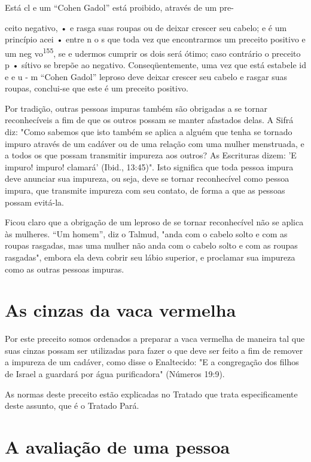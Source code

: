 Está cl e um ``Cohen Gadol'' está proibido, através de um pre-

ceito negativo, • e rasga suas roupas ou de deixar crescer seu cabelo; e
é um princípio acei • entre n o s que toda vez que encontrarmos um
preceito positi­vo e um neg vo\textsuperscript{155}, se e udermos
cumprir os dois será ótimo; caso contrário o preceito p • sítivo se
brepõe ao negativo. Conseqüentemente, uma vez que está estabele id e e u
- m ``Cohen Gadol'' leproso deve deixar crescer seu ca­belo e rasgar suas
roupas, conclui-se que este é um preceito positivo.

Por tradição, outras pessoas impuras também são obrigadas a se tor­nar
reconhecíveis a fim de que os outros possam se manter afastados delas. A
Sifrá diz: "Como sabemos que isto também se aplica a alguém que tenha se
tor­nado impuro através de um cadáver ou de uma relação com uma mulher
mens­truada, e a todos os que possam transmitir impureza aos outros? As
Escrituras dizem: 'E impuro! impuro! clamará' (Ibid., 13:45)". Isto
significa que toda pes­soa impura deve anunciar sua impureza, ou seja,
deve se tornar reconhecível como pessoa impura, que transmite impureza
com seu contato, de forma a que as pessoas possam evitá-la.

Ficou claro que a obrigação de um leproso de se tornar reconhecí­vel não
se aplica às mulheres. ``Um homem'', diz o Talmud, "anda com o cabe­lo
solto e com as roupas rasgadas, mas uma mulher não anda com o cabelo
sol­to e com as roupas rasgadas", embora ela deva cobrir seu lábio
superior, e pro­clamar sua impureza como as outras pessoas impuras.

\section{As cinzas da vaca vermelha}

Por este preceito somos ordenados a preparar a vaca vermelha de maneira
tal que suas cinzas possam ser utilizadas para fazer o que deve ser
feito a fim de remover a impureza de um cadáver, como disse o
Enaltecido: "E a congregação dos filhos de Israel a guardará por água
purificadora" (Números 19:9).

As normas deste preceito estão explicadas no Tratado que trata
es­pecificamente deste assunto, que é o Tratado Pará.

\section{A avaliação de uma pessoa}

